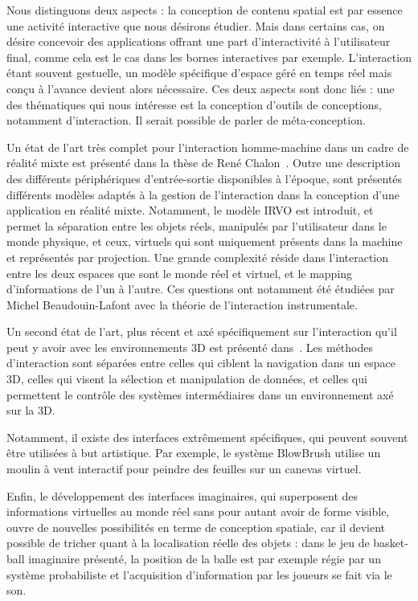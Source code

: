 \documentclass[french,12pt]{article}
\begin{document}
Nous distinguons deux aspects : la conception de contenu spatial est par essence une activité interactive que nous désirons étudier. 
Mais dans certains cas, on désire concevoir des applications offrant une part d'interactivité à l'utilisateur final, comme cela est le cas dans les bornes interactives par exemple. 
L'interaction étant souvent gestuelle, un modèle spécifique d'espace géré en temps réel mais conçu à l'avance devient alors nécessaire.
Ces deux aspects sont donc liés : une des thématiques qui nous intéresse est la conception d'outils de conceptions, notamment d'interaction. Il serait possible de parler de méta-conception.

Un état de l'art très complet pour l'interaction homme-machine dans un cadre de réalité mixte est présenté dans la thèse de René Chalon~\cite{chalon_realite_2004}. Outre une description des différents périphériques d'entrée-sortie disponibles à l'époque, sont présentés différents modèles adaptés à la gestion de l'interaction dans la conception d'une application en réalité mixte. Notamment, le modèle IRVO est introduit, et permet la séparation entre les objets réels, manipulés par l'utilisateur dans le monde physique, et ceux, virtuels qui sont uniquement présents dans la machine et représentés par projection. Une grande complexité réside dans l'interaction entre les deux espaces que sont le monde réel et virtuel, et le mapping d'informations de l'un à l'autre. Ces questions ont notamment été étudiées par Michel Beaudouin-Lafont avec la théorie de l'interaction instrumentale.

Un second état de l'art, plus récent et axé spécifiquement sur l'interaction qu'il peut y avoir avec les environnements 3D est présenté dans~\cite{jankowski_advances_2015}. Les méthodes d'interaction sont séparées entre celles qui ciblent la navigation dans un espace 3D, celles qui visent la sélection et manipulation de données, et celles qui permettent le contrôle des systèmes intermédiaires dans un environnement axé sur la 3D. 

Notamment, il existe des interfaces extrêmement spécifiques, qui peuvent souvent être utilisées à but artistique. Par exemple, le système BlowBrush\cite{shen_blowbrush:_2014} utilise un moulin à vent interactif pour peindre des feuilles sur un canevas virtuel.

Enfin, le développement des interfaces imaginaires\cite{gustafson_imaginary_2010}, qui superposent des informations virtuelles au monde réel sans pour autant avoir de forme visible, ouvre de nouvelles possibilités en terme de conception spatiale, car il devient possible de tricher quant à la localisation réelle des objets : dans le jeu de basket-ball imaginaire présenté, la position de la balle est par exemple régie par un système probabiliste et l'acquisition d'information par les joueurs se fait via le son.
\end{document}
